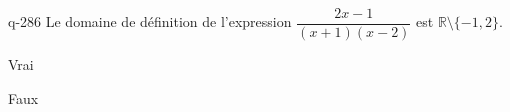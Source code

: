 \begin{truefalse}{q-286}
Le domaine de définition de l'expression $\dfrac{2x-1}{(x+1)(x-2)}$ est $\mathbb R \setminus \{-1,2\}$.
\item* Vrai
\item Faux
\end{truefalse}

